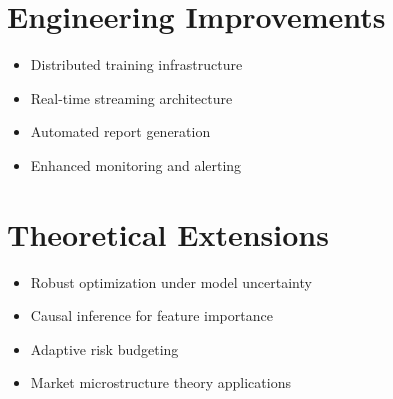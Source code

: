 \section{Engineering Improvements}
\begin{itemize}
  \item Distributed training infrastructure
  \item Real-time streaming architecture
  \item Automated report generation
  \item Enhanced monitoring and alerting
\end{itemize}

\section{Theoretical Extensions}
\begin{itemize}
  \item Robust optimization under model uncertainty
  \item Causal inference for feature importance
  \item Adaptive risk budgeting
  \item Market microstructure theory applications
\end{itemize}